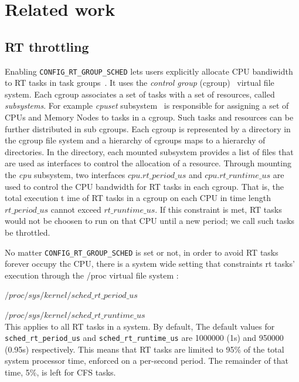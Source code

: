 \section{Related work\label{sec:RelatedWork}}

\subsection{RT throttling\label{sec:RelatedWork_RT}}

Enabling \texttt{CONFIG\_RT\_GROUP\_SCHED} lets users explicitly allocate
CPU bandiwidth to RT tasks in task groups~\cite{rt-throttling}. It uses 
the \emph{control group} (cgroup)~\cite{cgroups} virtual file system. 
Each cgroup associates a set of tasks with a set of resources, 
called \emph{subsystems}. For example \emph{cpuset} 
subsystem~\cite{cpusets} is responsible for assigning a set of CPUs and 
Memory Nodes to tasks in a cgroup. Such tasks and resources can be further 
distributed in sub cgroups. Each cgroup is represented by a directory in 
the cgroup file system and a hierarchy of cgroups maps to a hierarchy of 
directories. In the directory, each mounted subsystem provides a list of 
files that are used as interfaces to control the allocation of a resource.
Through mounting the \emph{cpu} subsystem, two interfaces 
$cpu.rt\_period\_us$ and $cpu.rt\_runtime\_us$ are used to control the 
CPU bandwidth for RT tasks in each cgroup. That is, the total execution t
ime of RT tasks in a cgroup on each CPU in time length $rt\_period\_us$ 
cannot exceed $rt\_runtime\_us$. If this constraint is met, RT tasks would 
not be choosen to run on that CPU until a new period; we call such tasks be 
throttled.

No matter \texttt{CONFIG\_RT\_GROUP\_SCHED} is set or not, in order to avoid RT 
tasks forever occupy thc CPU, there is a system wide setting that constraints
rt tasks' execution through the /proc virtual file system :

	$/proc/sys/kernel/sched\_rt\_period\_us$ 

	$/proc/sys/kernel/sched\_rt\_runtime\_us$ 
\\This applies to all RT tasks in a system. By default, 
The default values for \texttt{sched\_rt\_period\_us} and
\texttt{sched\_rt\_runtime\_us} are 1000000 (1s) and 950000 (0.95s)
respectively. This means that RT tasks are limited to 95\% of the total
system processor time, enforced on a per-second period. The remainder 
of that time, 5\%, is left for CFS tasks. 


